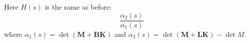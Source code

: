 Here $H(s)$ is the same as before:
\[
\frac{\alpha_2(s)}{\alpha_1(s)}
\]
where $\alpha_1(s)=\det(\mathbf{M}+\mathbf{BK})$ and $\alpha_2(s)=\det(\mathbf{M}+\mathbf{LK})-\det{M}$.
 


\endinput

